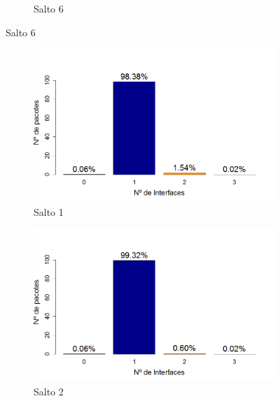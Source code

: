 \documentclass[
	12pt,				%
	openright,			%
	oneside,
	a4paper,			%
	english,			%
	french,				%
	spanish,			%
	brazil				%
	]{abntex2}
\begin{document}
\begin{figure}[htb]
\begin{subfigure}{.5\textwidth}
		\captionsetup{width=.9\textwidth}
		\caption{Salto 6}
		\label{prr_opt_s6}
	\end{subfigure}
\end{figure}

\begin{figure}[htb]
	\centering
	\caption{Ditribuição da recepção dos pacotes (Triangle)}
	\label{fig_dpr_opt}
	\begin{subfigure}{.5\textwidth}
		\centering
		\includegraphics[width=.98\linewidth]{DRP_OPT_Salto1}
		\captionsetup{width=.9\textwidth}
		\caption{Salto 1}
		\label{dpr_opt_s1}
	\end{subfigure}%
	\begin{subfigure}{.5\textwidth}
		\centering
		\includegraphics[width=.98\linewidth]{DRP_OPT_Salto2}
		\captionsetup{width=.9\textwidth}
		\caption{Salto 2}
		\label{dpr_opt_s2}
	\end{subfigure}
	\begin{subfigure}{.5\textwidth}

\end{subfigure}
\end{figure}
\end{document}
